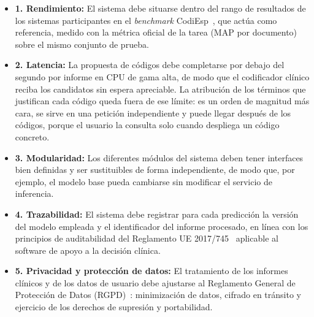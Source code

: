 \begin{itemize}
 \item \textbf{1. Rendimiento:} El sistema debe situarse dentro del rango de resultados de los sistemas participantes en el \emph{benchmark} CodiEsp~\cite{miranda2020}, que actúa como referencia, medido con la métrica oficial de la tarea (MAP por documento) sobre el mismo conjunto de prueba.
 \item \textbf{2. Latencia:} La propuesta de códigos debe completarse por debajo del segundo por informe en CPU de gama alta, de modo que el codificador clínico reciba los candidatos sin espera apreciable. La atribución de los términos que justifican cada código queda fuera de ese límite: es un orden de magnitud más cara, se sirve en una petición independiente y puede llegar después de los códigos, porque el usuario la consulta solo cuando despliega un código concreto.
 \item \textbf{3. Modularidad:} Los diferentes módulos del sistema deben tener interfaces bien definidas y ser sustituibles de forma independiente, de modo que, por ejemplo, el modelo base pueda cambiarse sin modificar el servicio de inferencia.
 \item \textbf{4. Trazabilidad:} El sistema debe registrar para cada predicción la versión del modelo empleada y el identificador del informe procesado, en línea con los principios de auditabilidad del Reglamento UE 2017/745~\cite{eu2017745} aplicable al software de apoyo a la decisión clínica.
 \item \textbf{5. Privacidad y protección de datos:} El tratamiento de los informes clínicos y de los datos de usuario debe ajustarse al Reglamento General de Protección de Datos (RGPD)~\cite{RGPD16}: minimización de datos, cifrado en tránsito y ejercicio de los derechos de supresión y portabilidad.
\end{itemize}